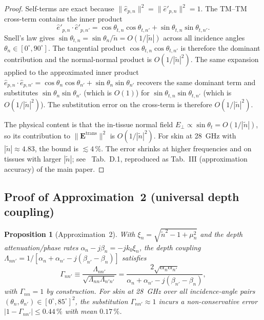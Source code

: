 \documentclass[10pt,journal,twocolumn]{IEEEtran}
\newcommand{\ntilde}{\tilde{n}}
\theoremstyle{plain}
\newtheorem{proposition}{Proposition}[section]
\theoremstyle{definition}
\begin{document}
\begin{proof}
Self-terms are exact because $\|\hat{e}_{p,n}\|^2 =
\|\hat{e}'_{p,n}\|^2 = 1$. The TM--TM cross-term contains the inner
product
\begin{equation}\label{eq:eppdot}
  \hat{e}'_{p,n} \cdot \hat{e}'_{p,n'}
  = \cos\theta_{t,n}\cos\theta_{t,n'}
  + \sin\theta_{t,n}\sin\theta_{t,n'}.
\end{equation}
Snell's law gives $\sin\theta_{t,n} = \sin\theta_n / \ntilde =
O(1/|\ntilde|)$ across all incidence angles
$\theta_n \in [0^{\circ}, 90^{\circ}]$. The tangential product
$\cos\theta_{t,n}\cos\theta_{t,n'}$ is therefore the dominant
contribution and the normal-normal product is $O(1/|\ntilde|^2)$.
The same expansion applied to the approximated inner product
$\hat{e}_{p,n} \cdot \hat{e}_{p,n'} = \cos\theta_n\cos\theta_{n'}
+ \sin\theta_n\sin\theta_{n'}$ recovers the same dominant term and
substitutes $\sin\theta_n\sin\theta_{n'}$ (which is $O(1)$) for
$\sin\theta_{t,n}\sin\theta_{t,n'}$ (which is $O(1/|\ntilde|^2)$).
The substitution error on the cross-term is therefore
$O(1/|\ntilde|^2)$.

The physical content is that the in-tissue normal field
$E_\perp \propto \sin\theta_t = O(1/|\ntilde|)$, so its contribution
to $\|\bm{E}^{\mathrm{trans}}\|^2$ is $O(1/|\ntilde|^2)$. For skin
at 28~GHz with $|\ntilde| \approx 4.83$, the bound is
$\lesssim 4\,\%$. The error shrinks at higher frequencies and on
tissues with larger $|\ntilde|$;
see~\cite{WydaegheMonograph} Tab.~D.1, reproduced as
Tab.~III (approximation accuracy) of the main paper.
\end{proof}

\subsection{Proof of Approximation~2 (universal depth coupling)}

\begin{proposition}[Approximation~2]\label{prop:S-approx2}
With $\xi_n = \sqrt{\ntilde^2 - 1 + \mu_n^2}$ and the depth
attenuation/phase rates $\alpha_n - j\beta_n = -j k_0 \xi_n$, the
depth coupling
$\Lambda_{nn'} = 1 / [\alpha_n + \alpha_{n'} - j(\beta_{n'} - \beta_n)]$
satisfies
\begin{equation}\label{eq:Gamma-norm}
  \Gamma_{nn'}
    \equiv \frac{\Lambda_{nn'}}{\sqrt{\Lambda_{nn}\Lambda_{n'n'}}}
    = \frac{2\sqrt{\alpha_n \alpha_{n'}}}
           {\alpha_n + \alpha_{n'} - j(\beta_{n'} - \beta_n)},
\end{equation}
with $\Gamma_{nn} = 1$ by construction. For skin at 28~GHz over all
incidence-angle pairs $(\theta_n, \theta_{n'}) \in
[0^{\circ}, 85^{\circ}]^2$, the substitution $\Gamma_{nn'} \approx 1$
incurs a non-conservative error $|1 - \Gamma_{nn'}| \leq 0.44\,\%$
with mean $0.17\,\%$.
\end{proposition}
\end{document}
